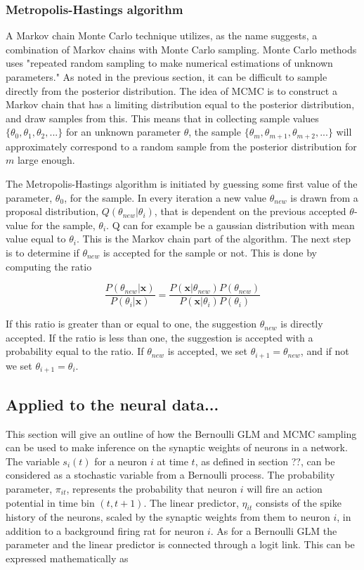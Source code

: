 \subsubsection{Metropolis-Hastings algorithm}
\label{Metropolis}
A Markov chain Monte Carlo technique utilizes, as the name suggests, a combination of Markov chains with Monte Carlo sampling. Monte Carlo methods uses "repeated random sampling to make numerical estimations of unknown parameters."  
As noted in the previous section, it can be difficult to sample directly from the posterior distribution. The idea of MCMC is to construct a Markov chain that has a limiting distribution equal to the posterior distribution, and draw samples from this. This means that in collecting sample values $\{\theta_0, \theta_1, \theta_2,...\}$ for an unknown parameter $\theta$, the sample $\{\theta_m, \theta_{m+1}, \theta_{m+2},...\}$ will approximately correspond to a random sample from the posterior distribution for $m$ large enough. 

The Metropolis-Hastings algorithm is initiated by guessing some first value of the parameter, $\theta_0$, for the sample. In every iteration a new value $\theta_{new}$ is drawn from a proposal distribution, $Q(\theta_{new}|\theta_i)$, that is dependent on the previous accepted $\theta$-value for the sample, $\theta_i$. Q can for example be a gaussian distribution with mean value equal to $\theta_i$. This is the Markov chain part of the algorithm. The next step is to determine if $\theta_{new}$ is accepted for the sample or not. This is done by computing the ratio

\begin{equation}
    \frac{P(\theta_{new}|{\bm x})}{P(\theta_i|{\bm x})} = 
    \frac{P({\bm x}|\theta_{new})P(\theta_{new})}{P({\bm x}|\theta_{i})P(\theta_{i})}
\end{equation}

If this ratio is greater than or equal to one, the suggestion $\theta_{new}$ is directly accepted. If the ratio is less than one, the suggestion is accepted with a probability equal to the ratio. If $\theta_{new}$ is accepted, we set $\theta_{i+1} = \theta_{new}$, and if not we set $\theta_{i+1} = \theta_i$.

\subsection{Applied to the neural data...}
This section will give an outline of how the Bernoulli GLM and MCMC sampling can be used to make inference on the synaptic weights of neurons in a network. The variable $s_i(t)$ for a neuron $i$ at time $t$, as defined in section ??, can be considered as a stochastic variable from a Bernoulli process. The probability parameter, $\pi_{it}$, represents the probability that neuron $i$ will fire an action potential in time bin $(t,t+1)$. The linear predictor, $\eta_{it}$ consists of the spike history of the neurons, scaled by the synaptic weights from them to neuron $i$, in addition to a background firing rat for neuron $i$. As for a Bernoulli GLM the parameter and the linear predictor is connected through a logit link. This can be expressed mathematically as

